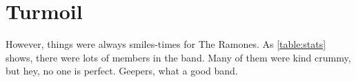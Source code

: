 \section{Turmoil}
\label{intro:turmoil}



However, things were always smiles-times for The Ramones.  As \ref{table:stats}
shows, there were lots of members in the band.  Many of them were kind crummy,
but hey, no one is perfect.  Geepers, what a good band.
